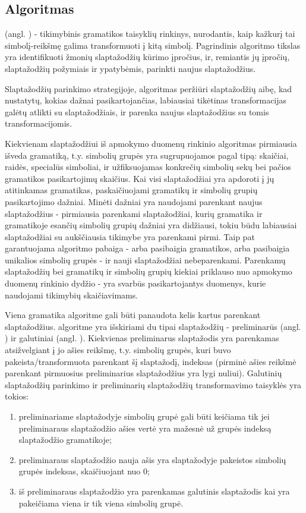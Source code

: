 \documentclass{VUMIFInfBakalaurinis}
\begin{document}
\subsection{ Algoritmas}
 (angl. ) - 
tikimybinis gramatikos taisyklių rinkinys, nurodantis, kaip kažkurį tai 
simbolį-reikšmę galima transformuoti į kitą simbolį. Pagrindinis algoritmo 
tikslas yra identifikuoti žmonių slaptažodžių kūrimo įpročius, ir, remiantis jų 
įpročių, slaptažodžių požymiais ir ypatybėmis, parinkti naujus slaptažodžius.

Slaptažodžių parinkimo strategijoje,  algoritmas peržiūri 
slaptažodžių aibę, kad nustatytų, kokias dažnai pasikartojančias, labiausiai 
tikėtinas transformacijas galėtų atlikti su slaptažodžiais, ir parenka naujus 
slaptažodžius su tomis transformacijomis.

Kiekvienam slaptažodžiui iš apmokymo duomenų rinkinio algoritmas pirmiausia 
išveda gramatiką, t.y. simbolių grupės yra sugrupuojamos pagal tipą: skaičiai, 
raidės, specialūs simboliai, ir užfiksuojamas konkrečių simbolių sekų bei pačios 
gramatikos pasikartojimų skaičius. Kai visi slaptažodžiai yra apdoroti į jų 
atitinkamas gramatikas, paskaičiuojami gramatikų ir simbolių grupių 
pasikartojimo dažniai. Minėti dažniai yra naudojami parenkant naujus 
slaptažodžius - pirmiausia parenkami slaptažodžiai, kurių gramatika ir 
gramatikoje esančių simbolių grupių dažniai yra didžiausi, tokiu būdu labiausiai 
slaptažodžiai su aukščiausia tikimybe yra parenkami pirmi. Taip pat garantuojama 
algoritmo pabaiga - arba pasibaigia gramatikos, arba pasibaigia unikalios 
simbolių grupės - ir nauji slaptažodžiai nebeparenkami. Parenkamų slaptažodžių 
bei gramatikų ir simbolių grupių kiekiai priklauso nuo apmokymo duomenų rinkinio 
dydžio - yra svarbūs pasikartojantys duomenys, kurie naudojami tikimybių 
skaičiavimams.

Viena gramatika  algoritme gali būti panaudota kelis kartus 
parenkant slaptažodžius.  algoritme yra išskiriami du tipai 
slaptažodžių - preliminarūs (angl. ) ir galutiniai 
(angl. ). Kiekvienas preliminarus slaptažodis yra parenkamas 
atsižvelgiant į jo ašies reikšmę, t.y. simbolių grupės, kuri buvo 
pakeista/transformuota parenkant šį slaptažodį, indeksas (pirminė ašies reikšmė 
parenkant pirmuosius preliminarius slaptažodžius yra lygi nuliui). Galutinių 
slaptažodžių parinkimo ir preliminarių slaptažodžių transformavimo taisyklės yra 
tokios:
\begin{enumerate}
  \item preliminariame slaptažodyje simbolių grupė gali būti keičiama tik jei 
    preliminaraus slaptažodžio ašies vertė yra mažesnė už grupės indeksą 
    slaptažodžio gramatikoje;
  \item preliminaraus slaptažodžio nauja ašis yra slaptažodyje pakeistos 
    simbolių grupės indeksas, skaičiuojant nuo 0;
  \item iš preliminaraus slaptažodžio yra parenkamas galutinis slaptažodis kai 
    yra pakeičiama viena ir tik viena simbolių grupė.
\end{enumerate}
\end{document}
